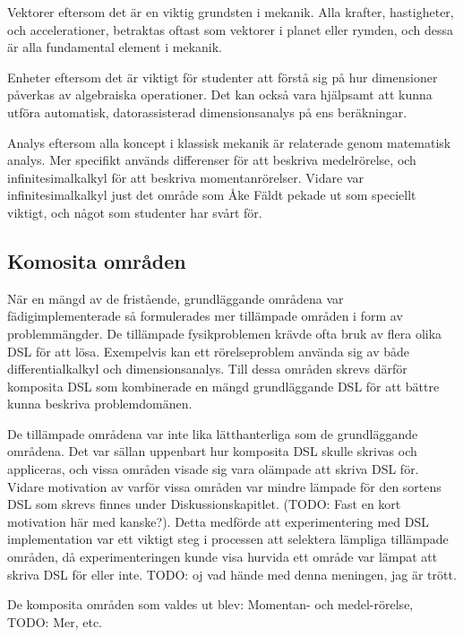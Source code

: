 \begin{binge}
\begin{draft}
  Vektorer eftersom det är en viktig grundsten i mekanik. Alla krafter,
  hastigheter, och accelerationer, betraktas oftast som vektorer i
  planet eller rymden, och dessa är alla fundamental element i
  mekanik.

  Enheter eftersom det är viktigt för studenter att förstå sig på hur
  dimensioner påverkas av algebraiska operationer. Det kan också vara
  hjälpsamt att kunna utföra automatisk, datorassisterad
  dimensionsanalys på ens beräkningar.

  Analys eftersom alla koncept i klassisk mekanik är relaterade genom
  matematisk analys. Mer specifikt används differenser för att beskriva
  medelrörelse, och infinitesimalkalkyl för att beskriva
  momentanrörelser. Vidare var infinitesimalkalkyl just det område som
  Åke Fäldt pekade ut som speciellt viktigt, och något som studenter har
  svårt för.

  \begin{binge}
  
  \subsection{Komosita områden}
  
    När en mängd av de fristående, grundläggande områdena var
    fädigimplementerade så formulerades mer tillämpade områden i form
    av problemmängder. De tillämpade fysikproblemen krävde ofta bruk
    av flera olika DSL för att lösa. Exempelvis kan ett rörelseproblem
    använda sig av både differentialkalkyl och dimensionsanalys.  Till
    dessa områden skrevs därför komposita DSL som kombinerade en mängd
    grundläggande DSL för att bättre kunna beskriva problemdomänen.

    De tillämpade områdena var inte lika lätthanterliga som de
    grundläggande områdena. Det var sällan uppenbart hur komposita DSL
    skulle skrivas och appliceras, och vissa områden visade sig vara
    olämpade att skriva DSL för. Vidare motivation av varför vissa
    områden var mindre lämpade för den sortens DSL som skrevs finnes
    under Diskussionskapitlet. (TODO: Fast en kort motivation här med
    kanske?). Detta medförde att experimentering med DSL
    implementation var ett viktigt steg i processen att selektera lämpliga
    tillämpade områden, då experimenteringen kunde visa hurvida ett område
    var lämpat att skriva DSL för eller inte. TODO: oj vad hände med
    denna meningen, jag är trött.
  \end{binge}

  De komposita områden som valdes ut blev: Momentan- och
  medel-rörelse, TODO: Mer, etc.


\end{draft}
\end{binge}
